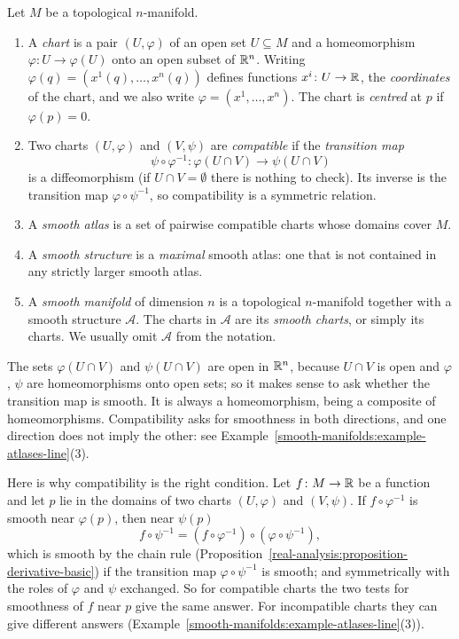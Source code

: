 \begin{definition}\label{smooth-manifolds:definition-manifold}
Let $M$ be a topological $n$-manifold.
\begin{enumerate}
\item A \emph{chart} is a pair $(U, \varphi)$ of an open set $U \subseteq M$ and a homeomorphism $\varphi \colon U \to \varphi(U)$ onto an open subset of
$\mathbb{R}^n$. Writing $\varphi(q) = (x^1(q), \ldots, x^n(q))$ defines functions $x^i \colon U \to \mathbb{R}$, the \emph{coordinates} of the chart, and we also write
$\varphi = (x^1, \ldots, x^n)$. The chart is \emph{centred} at $p$ if $\varphi(p) = 0$.
\item Two charts $(U, \varphi)$ and $(V, \psi)$ are \emph{compatible} if the \emph{transition map}
\[
\psi \circ \varphi^{-1} \colon \varphi(U \cap V) \to \psi(U \cap V)
\]
is a diffeomorphism (if $U \cap V = \emptyset$ there is nothing to check). Its inverse is the transition map $\varphi \circ \psi^{-1}$, so compatibility is a
symmetric relation.
\item A \emph{smooth atlas} is a set of pairwise compatible charts whose domains cover $M$.
\item A \emph{smooth structure} is a \emph{maximal} smooth atlas: one that is not contained in any strictly larger smooth atlas.
\item A \emph{smooth manifold} of dimension $n$ is a topological $n$-manifold together with a smooth structure $\mathcal{A}$. The charts in $\mathcal{A}$ are
its \emph{smooth charts}, or simply its charts. We usually omit $\mathcal{A}$ from the notation.
\end{enumerate}
\end{definition}

The sets $\varphi(U \cap V)$ and $\psi(U \cap V)$ are open in $\mathbb{R}^n$, because $U \cap V$ is open and $\varphi$, $\psi$ are homeomorphisms onto open sets; so it
makes sense to ask whether the transition map is smooth. It is always a homeomorphism, being a composite of homeomorphisms. Compatibility asks for smoothness in
both directions, and one direction does not imply the other: see Example~\ref{smooth-manifolds:example-atlases-line}(3).

\begin{remark}\label{smooth-manifolds:remark-why-compatible}
Here is why compatibility is the right condition. Let $f \colon M \to \mathbb{R}$ be a function and let $p$ lie in the domains of two charts $(U, \varphi)$ and
$(V, \psi)$. If $f \circ \varphi^{-1}$ is smooth near $\varphi(p)$, then near $\psi(p)$
\[
f \circ \psi^{-1} = (f \circ \varphi^{-1}) \circ (\varphi \circ \psi^{-1}),
\]
which is smooth by the chain rule (Proposition~\ref{real-analysis:proposition-derivative-basic}) if the transition map $\varphi \circ \psi^{-1}$ is smooth; and
symmetrically with the roles of $\varphi$ and $\psi$ exchanged. So for compatible charts the two tests for smoothness of $f$ near $p$ give the same answer.
For incompatible charts they can give different answers (Example~\ref{smooth-manifolds:example-atlases-line}(3)).
\end{remark}

